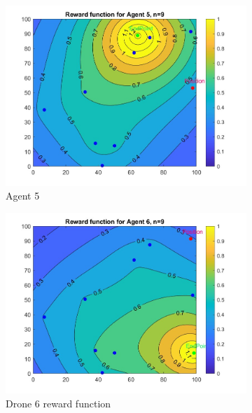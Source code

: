\begin{figure}[h]
\begin{subfigure}[b]{0.3\textwidth}
         \centering
         \includegraphics[width=\textwidth]{figures/RewardFunction5.jpg}
         \caption{Agent 5}
         \label{fig:r5}
     \end{subfigure}
     \hfill
     \begin{subfigure}[b]{0.3\textwidth}
         \centering
         \includegraphics[width=\textwidth]{figures/RewardFunction6.jpg}
         \caption{Drone 6 reward function}
         \label{fig:r6}
     \end{subfigure}
        \begin{subfigure}[b]{0.3\textwidth}
         \centering

\end{subfigure}
\end{figure}
